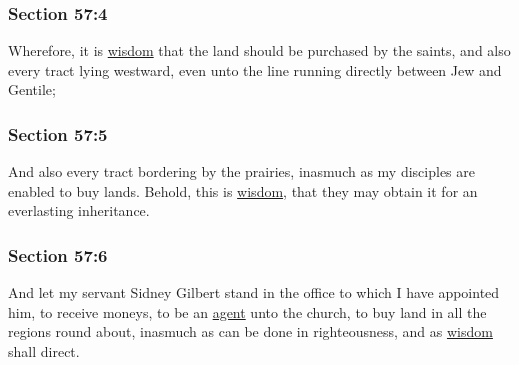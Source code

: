 	\subsubsection{Section 57:4} %
		\label{DC57-4}

		Wherefore, it is \hyperref[WISDOM]{wisdom} that the land should be purchased by the saints, and also every tract lying westward, even unto the line running directly between Jew and Gentile;


	\subsubsection{Section 57:5} %
		\label{DC57-5}

		And also every tract bordering by the prairies, inasmuch as my disciples are enabled to buy lands.  Behold, this is \hyperref[WISDOM]{wisdom}, that they may obtain it for an everlasting inheritance.


	\subsubsection{Section 57:6} %
		\label{DC57-6}

		And let my servant Sidney Gilbert stand in the office to which I have appointed him, to receive moneys, to be an \hyperref[AGENCY]{agent} unto the church, to buy land in all the regions round about, inasmuch as can be done in righteousness, and as \hyperref[WISDOM]{wisdom} shall direct.


